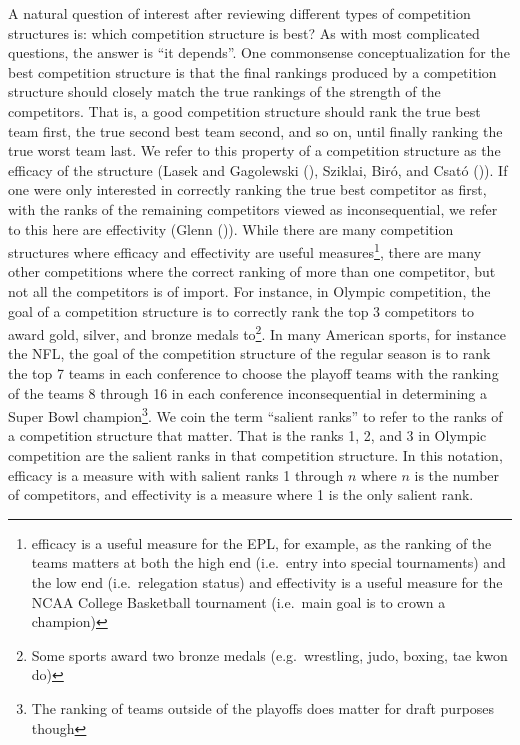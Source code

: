 \documentclass[
  12pt,
]{article}
\begin{document}
A natural question of interest after reviewing different types of
competition structures is: which competition structure is best? As with
most complicated questions, the answer is ``it depends''. One
commonsense conceptualization for the best competition structure is that
the final rankings produced by a competition structure should closely
match the true rankings of the strength of the competitors. That is, a
good competition structure should rank the true best team first, the
true second best team second, and so on, until finally ranking the true
worst team last. We refer to this property of a competition structure as
the efficacy of the structure (Lasek and Gagolewski
(), Sziklai, Biró, and Csató
()). If one were only interested in
correctly ranking the true best competitor as first, with the ranks of
the remaining competitors viewed as inconsequential, we refer to this
here are effectivity (Glenn ()). While
there are many competition structures where efficacy and effectivity are
useful measures\footnote{efficacy is a useful measure for the EPL, for
  example, as the ranking of the teams matters at both the high end
  (i.e.~entry into special tournaments) and the low end (i.e.~relegation
  status) and effectivity is a useful measure for the NCAA College
  Basketball tournament (i.e.~main goal is to crown a champion)}, there
are many other competitions where the correct ranking of more than one
competitor, but not all the competitors is of import. For instance, in
Olympic competition, the goal of a competition structure is to correctly
rank the top 3 competitors to award gold, silver, and bronze medals
to\footnote{Some sports award two bronze medals (e.g.~wrestling, judo,
  boxing, tae kwon do)}. In many American sports, for instance the NFL,
the goal of the competition structure of the regular season is to rank
the top 7 teams in each conference to choose the playoff teams with the
ranking of the teams 8 through 16 in each conference inconsequential in
determining a Super Bowl champion\footnote{The ranking of teams outside
  of the playoffs does matter for draft purposes though}. We coin the
term ``salient ranks'' to refer to the ranks of a competition structure
that matter. That is the ranks 1, 2, and 3 in Olympic competition are
the salient ranks in that competition structure. In this notation,
efficacy is a measure with with salient ranks 1 through \(n\) where
\(n\) is the number of competitors, and effectivity is a measure where 1
is the only salient rank.\\
\end{document}
